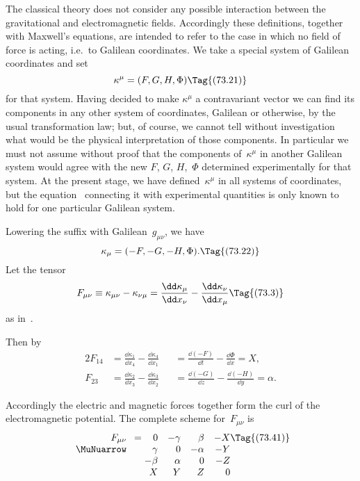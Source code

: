 \documentclass[12pt]{book}
\begin{document}
The classical theory does not consider any possible interaction between the
gravitational and electromagnetic fields. Accordingly these definitions, together
with Maxwell's equations, are intended to refer to the case in which no
field of force is acting, i.e.\ to Galilean coordinates. We take a special system
of Galilean coordinates and set
\[
\kappa^{\mu} = (F, G, H, \Phi)
\Tag{(73.21)}
\]
for that system. Having decided to make $\kappa^{\mu}$ a contravariant vector we can
find its components in any other system of coordinates, Galilean or otherwise,
by the usual transformation law; but, of course, we cannot tell without investigation
what would be the physical interpretation of those components. In
particular we must not assume without proof that the components of~$\kappa^{\mu}$ in
another Galilean system would agree with the new $F$, $G$, $H$,~$\Phi$ determined
experimentally for that system. At the present stage, we have defined~$\kappa^{\mu}$ in all
systems of coordinates, but the equation~ connecting it with experimental
quantities is only known to hold for one particular Galilean system.

Lowering the suffix with Galilean~$g_{\mu\nu}$, we have
\[
\kappa_{\mu} = (-F, -G, -H, \Phi).
\Tag{(73.22)}
\]
Let the tensor
\[
F_{\mu\nu} \equiv \kappa_{\mu\nu} - \kappa_{\nu\mu}
= \frac{\dd\kappa_{\mu}}{\dd x_{\nu}} - \frac{\dd\kappa_{\nu}}{\dd x_{\mu}}
\Tag{(73.3)}
\]
as in~.

Then by~
\begin{alignat*}{2}
  F_{14} &= \frac{\dd\kappa_{1}}{\dd x_{4}} - \frac{\dd\kappa_{4}}{\dd x_{1}}
  &&= \frac{\dd(-F)}{\dd t} - \frac{\dd\Phi}{\dd x} = X, \\
  F_{23} &= \frac{\dd\kappa_{2}}{\dd x_{3}} - \frac{\dd\kappa_{3}}{\dd x_{2}}
  &&= \frac{\dd(-G)}{\dd z} - \frac{\dd(-H)}{\dd y} = \alpha.
\end{alignat*}

Accordingly the electric and magnetic forces together form the curl of the
electromagnetic potential. The complete scheme for~$F_{\mu\nu}$ is
\[
\begin{array}[t]{r}
  F_{\mu\nu} \\
  \MuNuarrow
\end{array}
=
\begin{array}[t]{@{}r@{\quad}r@{\quad}r@{\quad}r@{}}
  0 & -\gamma & \beta & -X\\
  \gamma & 0 & -\alpha & -Y\\
  -\beta & \alpha & 0 & -Z\\
  X & Y & Z & 0\\
\end{array}
\Tag{(73.41)}
\]
\end{document}
